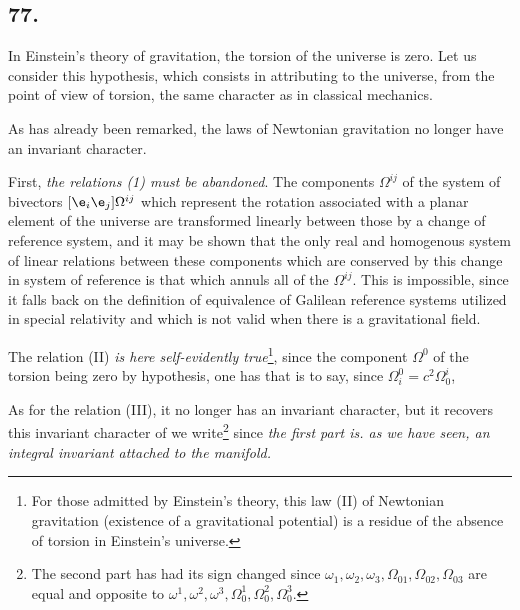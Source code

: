 \subsection*{77.}

In Einstein's theory of gravitation, the torsion of the universe is zero. Let us consider this hypothesis, which consists in attributing to the universe, from the point of view of torsion, the same character as in classical mechanics.

As has already been remarked, the laws of Newtonian gravitation no longer have an invariant character. 

First, \textit{the relations (1) must be abandoned}. The components $\Omega^{ij}$ of the system of bivectors $[\e_i \e_j]\Omega^{ij}$ which represent the rotation associated with a planar element of the universe are transformed linearly between those by a change of reference system, and it may be shown that the only real and homogenous system of linear relations between these components which are conserved by this change in system of reference is that which annuls all of the $\Omega^{ij}$. This is impossible, since it falls back on the definition of equivalence of Galilean reference systems utilized in special relativity and which is not valid when there is a gravitational field.

The relation (II)
\textit{is here self-evidently true}\footnote{For those admitted by Einstein's theory, this law (II) of Newtonian gravitation (existence of a gravitational potential) is a residue of the absence of torsion in Einstein's universe.}, since the component $\Omega^0$ of the torsion being zero by hypothesis, one has
that is to say, since $\Omega_i^0 = c^2\Omega_0^i$,

As for the relation (III), it no longer has an invariant character, but it recovers this invariant character of we write\footnote{The second part has had its sign changed since $\omega_1, \omega_2, \omega_3, \Omega_{01}, \Omega_{02}, \Omega_{03}$ are equal and opposite to $\omega^1, \omega^2, \omega^3, \Omega_0^1, \Omega_0^2, \Omega_0^3$. }
since \textit{the first part is. as we have seen, an integral invariant attached to the manifold.}